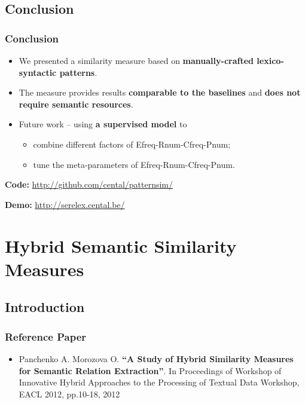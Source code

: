 \documentclass{beamer}
\begin{document}
\subsection{Conclusion}


\begin{frame}
\frametitle{Conclusion}

\begin{itemize}
  \item We presented a similarity measure based on \textbf{manually-crafted lexico-syntactic patterns}.
 

\item The measure provides results \textbf{comparable to the baselines} and \textbf{does not require semantic resources}.

\item Future work -- using \textbf{a supervised model} to
\begin{itemize}
\item combine different factors of Efreq-Rnum-Cfreq-Pnum;
\item tune the meta-parameters of Efreq-Rnum-Cfreq-Pnum.
\end{itemize}
    
\end{itemize}


\textbf{Code:} {\footnotesize \url{http://github.com/cental/patternsim/}}

\textbf{Demo:} {\footnotesize \url{http://serelex.cental.be/}}


\end{frame}



\section{Hybrid Semantic Similarity Measures}

\subsection{Introduction}



\begin{frame}
\frametitle{Reference Paper}

\begin{itemize}

\item Panchenko A. Morozova O. \textbf{“A Study of Hybrid Similarity Measures for Semantic Relation Extraction”}. In Proceedings of Workshop of Innovative Hybrid Approaches to the Processing of Textual Data Workshop, EACL 2012, pp.10-18, 2012
\end{itemize}

\end{frame}
\end{document}

